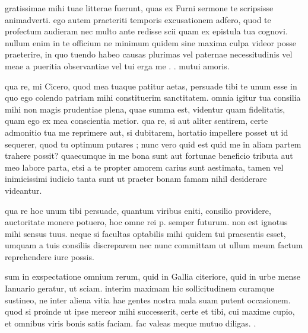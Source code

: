 


 gratissimae mihi tuae litterae fuerunt, quas ex Furni sermone te scripsisse animadverti. ego autem praeteriti temporis excusationem adfero, quod te profectum audieram nec multo ante redisse scii quam ex epistula tua cognovi. nullum enim in te officium ne minimum quidem sine maxima culpa videor posse praeterire, in quo tuendo habeo causas plurimas vel paternae necessitudinis vel meae a pueritia observantiae vel tui erga me . . mutui amoris.

 qua re, mi Cicero, quod mea tuaque patitur aetas, persuade tibi te unum esse in quo ego colendo patriam mihi constituerim sanctitatem. omnia igitur tua consilia mihi non magis prudentiae plena, quae summa est, videntur quam fidelitatis, quam ego ex mea conscientia metior. qua re, si aut aliter sentirem, certe admonitio tua me reprimere aut, si dubitarem, hortatio impellere posset ut id sequerer, quod tu optimum putares ; nunc vero quid est quid me in aliam partem trahere possit? quaecumque in me bona sunt aut fortunae beneficio tributa aut meo labore parta, etsi a te propter amorem carius sunt aestimata, tamen vel inimicissimi iudicio tanta sunt ut praeter bonam famam nihil desiderare videantur.

 qua re hoc unum tibi persuade, quantum viribus eniti, consilio providere, auctoritate monere potuero, hoc omne rei p. semper futurum. non est ignotus mihi sensus tuus. neque si facultas optabilis mihi quidem tui praesentis esset, umquam a tuis consiliis discreparem nec nunc committam ut ullum meum factum reprehendere iure possis.

 sum in exspectatione omnium rerum, quid in Gallia citeriore, quid in urbe mense Ianuario geratur, ut sciam. interim maximam hic sollicitudinem curamque sustineo, ne inter aliena vitia hae gentes nostra mala suam putent occasionem. quod si proinde ut ipse mereor mihi successerit, certe et tibi, cui maxime cupio, et omnibus viris bonis satis faciam. fac valeas meque mutuo diligas. .
